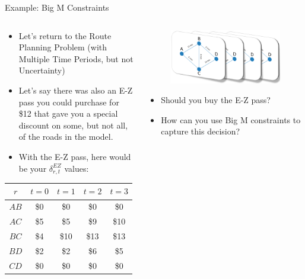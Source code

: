 \documentclass[10pt, aspectratio=169]{beamer}
\begin{document}
\begin{frame}{Example: Big M Constraints}
    \begin{columns}
        \begin{column}{0.5\textwidth}
            \begin{itemize}
                \item Let's return to the Route Planning Problem (with Multiple Time Periods, but not Uncertainty)
                \item Let's say there was also an E-Z pass you could purchase for \$12 that gave you a special discount on some, but not all, of the roads in the model.
                \item With the E-Z pass, here would be your $\delta^{EZ}_{r,t}$ values:
            \end{itemize}
            \begin{tabular}{|c||c|c|c|c|}
                \hline
                $r$ & $t=0$ & $t=1$ & $t=2$ & $t=3$ \\
                \hline \hline
                $AB$ & \$0 & \$0 & \$0 & \$0\\
                \hline
                $AC$ & \$5 & \$5 & \$9 & \$10\\
                \hline
                $BC$ & \$4 & \$10 & \$13 & \$13\\
                \hline
                $BD$ & \$2 & \$2 & \$6 & \$5\\
                \hline
                $CD$ & \$0 & \$0 & \$0 & \$0\\
                \hline
            \end{tabular}
        \end{column}
        \begin{column}{0.5\textwidth}
            \begin{figure}
                \includegraphics[width=\linewidth]{RoutePlanningProblemRepeated.png}
            \end{figure}
            \begin{itemize}
                \item Should you buy the E-Z pass?
                \item How can you use Big M constraints to capture this decision?
                

\end{itemize}
\end{column}
\end{columns}
\end{frame}
\end{document}
